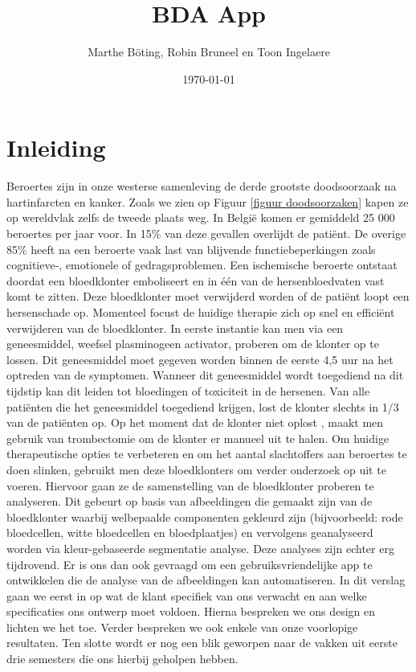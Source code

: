 \documentclass[a4paper,kulak]{kulakarticle}
\date{\today}
\title{BDA App}
\author{Marthe B\"{o}ting, Robin Bruneel en Toon Ingelaere}
\begin{document}
	
	
	\maketitle
	\section*{Inleiding}
		Beroertes zijn in onze westerse samenleving de derde grootste doodsoorzaak na hartinfarcten en kanker. Zoals we zien op Figuur \ref{figuur doodsoorzaken} kapen ze op wereldvlak zelfs de tweede plaats weg\cite{worldhealthorganization}. In België komen er gemiddeld 25 000 beroertes per jaar voor. In 15\% van deze gevallen overlijdt de patiënt. De overige 85\% heeft na een beroerte vaak last van blijvende functiebeperkingen zoals cognitieve-, emotionele of gedragsproblemen. Een ischemische beroerte ontstaat doordat een bloedklonter emboliseert en in één van de hersenbloedvaten vast komt te zitten. Deze bloedklonter moet verwijderd worden of de patiënt loopt een hersenschade op.
		Momenteel focust de huidige therapie zich op snel en efficiënt verwijderen van de bloedklonter. In eerste instantie kan men via een geneesmiddel, weefsel plasminogeen activator, proberen om de klonter op te lossen. Dit geneesmiddel moet gegeven worden binnen de eerste 4,5 uur na het optreden van de symptomen. Wanneer dit geneesmiddel wordt toegediend na dit tijdstip kan dit leiden tot bloedingen of toxiciteit in de hersenen. Van alle patiënten die het geneesmiddel toegediend krijgen, lost de klonter slechts in 1/3 van de patiënten op.
		Op het moment dat de klonter niet oplost , maakt men gebruik van trombectomie om de klonter er manueel uit te halen.
		Om huidige therapeutische opties te verbeteren en om het aantal slachtoffers aan beroertes te doen slinken, gebruikt men deze bloedklonters om verder onderzoek op uit te voeren. Hiervoor gaan ze de samenstelling van de bloedklonter proberen te analyseren. Dit gebeurt op basis van afbeeldingen die gemaakt zijn van de bloedklonter waarbij welbepaalde componenten gekleurd zijn (bijvoorbeeld: rode bloedcellen, witte bloedcellen en bloedplaatjes) en vervolgens geanalyseerd worden via kleur-gebaseerde segmentatie analyse.
		Deze analyses zijn echter erg tijdrovend. Er is ons dan ook gevraagd om een gebruiksvriendelijke app te ontwikkelen die de analyse van de afbeeldingen kan automatiseren.
		In dit verslag gaan we eerst in op wat de klant specifiek van ons verwacht en aan welke specificaties ons ontwerp moet voldoen. Hierna bespreken we ons design en lichten we het toe. Verder bespreken we ook enkele van onze voorlopige resultaten. Ten slotte wordt er nog een blik geworpen naar de vakken uit eerste drie semesters die ons hierbij geholpen hebben.
\end{document}
